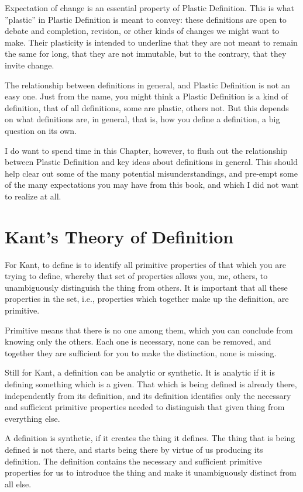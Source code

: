 \documentclass[graybox,envcountchap,sectrefs]{svmono}
\newcommand{\newdef}[1]{Plastic Definition}
\begin{document}
Expectation of change is an essential property of \newdef s. This is what ''plastic'' in \newdef{} is meant to convey: these definitions are open to debate and completion, revision, or other kinds of changes we might want to make. Their plasticity is intended to underline that they are not meant to remain the same for long, that they are not immutable, but to the contrary, that they invite change.

The relationship between definitions in general, and \newdef s is not an easy one. Just from the name, you might think a \newdef{} is a kind of definition, that of all definitions, some are plastic, others not. But this depends on what definitions are, in general, that is, how you define a definition, a big question on its own.

I do want to spend time in this Chapter, however, to flush out the relationship between \newdef s and key ideas about definitions in general. This should help clear out some of the many potential misunderstandings, and pre-empt some of the many expectations you may have from this book, and which I did not want to realize at all.

\section{Kant's Theory of Definition}
\label{c4:s2}
For Kant, to define is to identify all primitive properties of that which you are trying to define, whereby that set of properties allows you, me, others, to unambiguously distinguish the thing from others. It is important that all these properties in the set, i.e., properties which together make up the definition, are primitive. 

Primitive means that there is no one among them, which you can conclude from knowing only the others. Each one is necessary, none can be removed, and together they are sufficient for you to make the distinction, none is missing.\cite{kant1999critique,kant2004lectures,beck1956kant} 

Still for Kant, a definition can be analytic or synthetic. It is analytic if it is defining something which is a given. That which is being defined is already there, independently from its definition, and its definition identifies only the necessary and sufficient primitive properties needed to distinguish that given thing from everything else. 

A definition is synthetic, if it creates the thing it defines. The thing that is being defined is not there, and starts being there by virtue of us producing its definition. The definition contains the necessary and sufficient primitive properties for us to introduce the thing and make it unambiguously distinct from all else.
\end{document}
